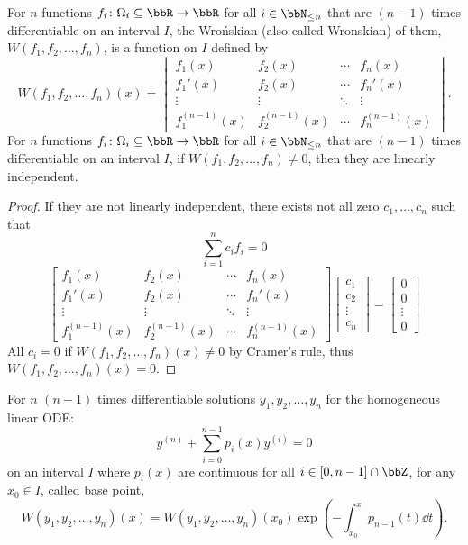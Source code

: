\documentclass[a4paper,12pt]{report}
\begin{document}
For $n$ functions $f_i\colon\Omega_i\subseteq\bbR\to\bbR$ for all $i\in\bbN_{\le n}$ that are $(n-1)$ times differentiable on an interval $I$, the Wrońskian (also called Wronskian) of them, $W(f_1,f_2,\ldots,f_n)$, is a function on $I$ defined by
\[W(f_1,f_2,\ldots,f_n)(x)=\begin{vmatrix}
f_1(x) & f_2(x) & \cdots & f_n(x) \\
f_1'(x) & f_2(x) & \cdots & f_n'(x) \\
\vdots & \vdots & \ddots & \vdots \\
f_1^{(n-1)}(x) & f_2^{(n-1)}(x) & \cdots & f_n^{(n-1)}(x)
\end{vmatrix}.\]
For $n$ functions $f_i\colon\Omega_i\subseteq\bbR\to\bbR$ for all $i\in\bbN_{\le n}$ that are $(n-1)$ times differentiable on an interval $I$, if $W(f_1,f_2,\ldots,f_n)\ne0$, then they are linearly independent.
\begin{proof}
If they are not linearly independent, there exists not all zero $c_1,\ldots,c_n$ such that
\[\sum_{i=1}^nc_if_i=0\]
\[\begin{bmatrix}
f_1(x) & f_2(x) & \cdots & f_n(x) \\
f_1'(x) & f_2(x) & \cdots & f_n'(x) \\
\vdots & \vdots & \ddots & \vdots \\
f_1^{(n-1)}(x) & f_2^{(n-1)}(x) & \cdots & f_n^{(n-1)}(x)
\end{bmatrix}\begin{bmatrix}c_1\\c_2\\\vdots\\c_n\end{bmatrix}=\begin{bmatrix}0\\0\\\vdots\\0\end{bmatrix}\]
All $c_i=0$ if $W(f_1,f_2,\ldots,f_n)(x)\ne 0$ by Cramer's rule, thus $W(f_1,f_2,\ldots,f_n)(x)=0$.
\end{proof}
For $n$ $(n-1)$ times differentiable solutions $y_1,y_2,\ldots,y_n$ for the homogeneous linear ODE:
\[y^{(n)}+\sum_{i=0}^{n-1}p_i(x)y^{(i)}=0\]
on an interval $I$ where $p_i(x)$ are continuous for all $i\in[0,n-1]\cap\bbZ$, for any $x_0\in I$, called base point,
\[W(y_1,y_2,\ldots,y_n)(x)=W(y_1,y_2,\ldots,y_n)(x_0)\exp(-\int_{x_0}^xp_{n-1}(t)\dd{t}).\]
\end{document}
